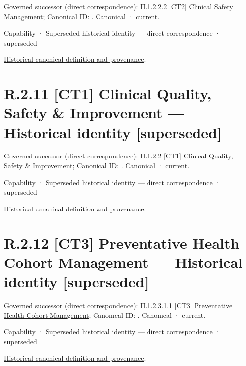 {\small Governed successor (direct correspondence): II.1.2.2.2 \hyperref[element:28d1bf3e514e4c29837ebedaf9e4917b]{[CT2] Clinical Safety Management}; Canonical ID: \texttt{}. Canonical · current.}\par
\label{element:650ccec030fa46cc8c9d6b508a841778}
{\small Capability · Superseded historical identity — direct correspondence · superseded}\par
\href{../../../../continuum/strategy/capability/650ccec030fa46cc8c9d6b508a841778.md}{Historical canonical definition and provenance}.\par
\section*{R.2.11 [CT1] Clinical Quality, Safety \& Improvement — Historical identity [superseded]}
\label{navigation:R.2.11}

{\small Governed successor (direct correspondence): II.1.2.2 \hyperref[element:63837bf848774572a06b935af95581a2]{[CT1] Clinical Quality, Safety \& Improvement}; Canonical ID: \texttt{}. Canonical · current.}\par
\label{element:b967c383dbcd4c24abe6a83ea5e79e00}
{\small Capability · Superseded historical identity — direct correspondence · superseded}\par
\href{../../../../continuum/strategy/capability/b967c383dbcd4c24abe6a83ea5e79e00.md}{Historical canonical definition and provenance}.\par
\section*{R.2.12 [CT3] Preventative Health Cohort Management — Historical identity [superseded]}
\label{navigation:R.2.12}

{\small Governed successor (direct correspondence): II.1.2.3.1.1 \hyperref[element:97625bb28e5745d5994e1bffd4037188]{[CT3] Preventative Health Cohort Management}; Canonical ID: \texttt{}. Canonical · current.}\par
\label{element:fef479f0fd5048b19b2aec770f0233fe}
{\small Capability · Superseded historical identity — direct correspondence · superseded}\par
\href{../../../../continuum/strategy/capability/fef479f0fd5048b19b2aec770f0233fe.md}{Historical canonical definition and provenance}.\par
